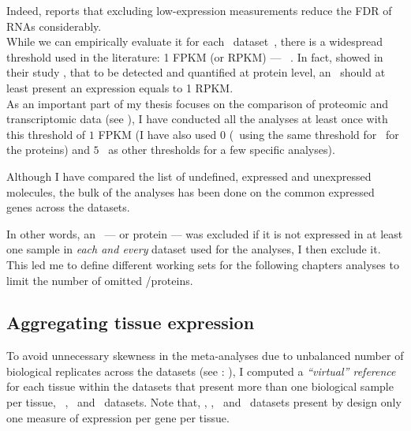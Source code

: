 \begin{itemize}
\begin{itemize}
                Indeed, \citet{seqcmaqc} reports that
                excluding low-expression measurements reduce the \gls{FDR}
                of \glspl{RNA} considerably.\\
                While we can empirically evaluate it for each \Rnaseq\
                dataset~,
                there is a widespread threshold used in the literature:
                1 \gls{FPKM} (or \gls{RPKM}) --- \eg{}~\citet{Uhlen2014,Uhlen2015}.
                In fact, \citet{Hebenstreit:2011} showed in their study
                \paper{\citetitle{Hebenstreit:2011}},
                that to be detected and quantified at protein level,
                an \mRNA\ should at least present an expression equals to 1 \gls{RPKM}.\\
                As an important part of my thesis focuses on
                the comparison of proteomic and transcriptomic data (see ),
                I have conducted all the analyses at least once with this threshold of $1$ \gls{FPKM}
                (I have also used $0$ (\ie\ using the same threshold for \mRNAs\
                for the proteins) and $5$ \FPKM\ as other thresholds
                for a few specific analyses).
        \end{itemize}
\end{itemize}

\vspace{-0.1in}
Although I have compared the list of
undefined, expressed and unexpressed molecules,
the bulk of the analyses has been done on the common expressed genes across
the datasets.\mybr\

In other words, an \mRNA\ --- or protein --- was excluded
if it is not expressed in at least
one sample in \emph{each and every} dataset used for the analyses,
I then exclude it.
This led me to define different working sets for the following chapters analyses
to limit the number of omitted \mRNAs/proteins.\mybr\

\subsection{Aggregating tissue expression}\label{subsec:averagedTissue}
\vspace{-0.15in}
To avoid unnecessary skewness in the meta-analyses due to
unbalanced number of
biological replicates across the datasets (see :
),
I computed a \emph{\enquote{virtual} reference} for each tissue
within the datasets that present more than one biological sample per tissue,
\ie\ \vt, \uhlen\ and \gtex\ datasets.
Note that, \castle, \cutler, \kuster\ and \pandey\ datasets present by design only
one measure of expression per gene per tissue.\mybr\

